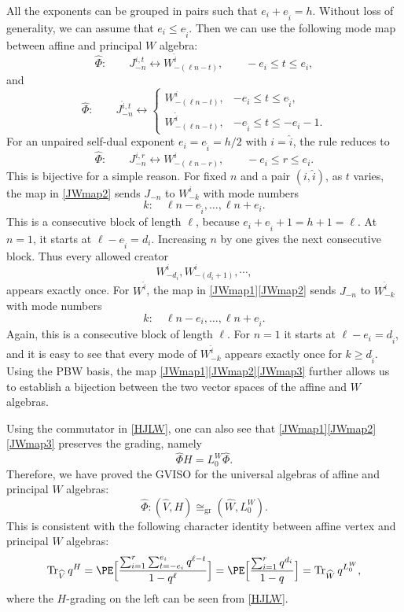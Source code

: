 \documentclass[a4paper,11pt]{article}
\theoremstyle{definition}
\theoremstyle{definition}
\theoremstyle{remark}
\newcommand{\be}{\begin{equation}}
\newcommand{\ee}{\end{equation}}
\begin{document}
All the exponents can be grouped in pairs such that $e_i +e_{\hat i}=h$. Without loss of generality, we can assume that $e_i \le e_{\hat i}$. Then we can use the following mode map between affine and principal $W$ algebra:
\be \label{JWmap1}
\widehat \Phi: \qquad J^{i,t}_{-n}\longleftrightarrow W^{\hat i}_{-(\ell n-t)},
\qquad  -e_i\le t\le e_i,
\ee
and
\be 
\widehat \Phi: \qquad  J^{\hat i,t}_{-n}\longleftrightarrow
\begin{cases}\label{JWmap2}
W^i_{-( \ell n-t)},&-e_{  i}\le t\le e_{ \hat i},\\
W^{\hat i}_{-(\ell n-t)},&-e_{ \hat i}\le t\le-e_{   i}-1.
\end{cases} 
\ee
 For an unpaired self-dual exponent $ e_i= e_{\hat i}=h/2$ with $i=\hat i$, the rule reduces to 
\be\label{JWmap3}
\widehat \Phi: \qquad  J^{i,r}_{-n}\longleftrightarrow W^i_{-(\ell n-r)},\qquad  -e_i\le r\le e_i.
\ee
This is bijective for a simple reason.  For    fixed $n$ and a pair   $( i , \hat  i)$, as   $t$ varies, the map in \eqref{JWmap2} sends  $J_{-n} $ to  $ W^i_{-k}$ with mode numbers
\be
k: \quad\ell n-e_{ \hat i},\ldots,\ell n+e_{  i}.
\ee
This is a consecutive block of length $ \ell $, because $e_i+e_{  \hat i}+1=h+1=\ell$. At $ n=1$, it starts at
$
\ell -e_{ \hat i} =d_i.
$
Increasing $ n$ by one gives the next consecutive block. Thus every allowed creator
\be
W^i_{-d_i},W^i_{-(d_i+1)},\cdots,
\ee 
appears exactly once.  For $ W^{\hat i}$,   the map in  \eqref{JWmap1}\eqref{JWmap2}  sends  $J_{-n} $ to  $ W^{\hat i}_{-k}$ with mode numbers
\be
k: \quad\ell n-e_{   i},\ldots,\ell n+e_{\hat  i}.
\ee
Again, this is a consecutive block of length $ \ell $. For $n=1$ it starts at $\ell -e_{   i} =d_{ \hat i}$, and it is easy to see that every mode of $ W^{\hat i}_{-k}$ appears exactly once for $k\ge d_{\hat i}$. Using the PBW basis, the map  \eqref{JWmap1}\eqref{JWmap2}\eqref{JWmap3} further allows us to establish a bijection between the two vector spaces   of the affine and $W$ algebras. 

Using the commutator in \eqref{HJLW}, one can also see that \eqref{JWmap1}\eqref{JWmap2}\eqref{JWmap3} preserves the grading, namely 
\be
\widehat\Phi H=   L_0^W\widehat  \Phi.
\ee
Therefore, we have proved the  GVISO for the universal algebras of affine and principal $W$ algebras: 
\be 
\widehat\Phi:
(\widehat V,H)\cong_{\mathrm{gr}}
(\widehat W,L^W_0).
\ee
This is consistent with the following character identity between affine vertex and principal $W$ algebras: 
\be
\operatorname{Tr}_{\widehat V}q^H=
\PE\Big[\frac{\sum_{i=1}^r \sum_{t=-e_i}^{e_i}q^{\ell-t}}{1-q^\ell}\Big]=\PE\Big[ \frac{\sum_{i=1}^r q^{d_i}}{1-q}\Big]
=\operatorname{Tr}_{\widehat W}q^{L_0^W},
\ee
where the $H$-grading on the left can be seen from \eqref{HJLW}.
\end{document}
